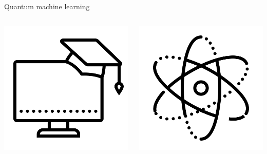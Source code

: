 \documentclass{beamer}
\begin{document}
    \begin{frame}[t]{Quantum machine learning}
        \vspace{-.5cm}
        \begin{columns}
            \begin{center}
                \includegraphics[width=.8\columnwidth]{gfx/icons/icons8-machine-learning-480.png}                
            \end{center}
            \begin{center}
                \includegraphics[width=.8\columnwidth]{gfx/icons/icons8-physics-480.png}                

\end{center}
\end{columns}
\end{frame}
\end{document}
